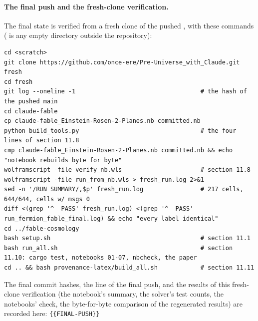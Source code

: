 \paragraph{The final push and the fresh-clone verification.} The final state is verified from a fresh clone of
the pushed , with these commands ( is any empty directory outside the
repository):
\begin{Verbatim}[fontsize=\scriptsize]
cd <scratch>
git clone https://github.com/once-ere/Pre-Universe_with_Claude.git fresh
cd fresh
git log --oneline -1                                   # the hash of the pushed main
cd claude-fable
cp claude-fable_Einstein-Rosen-2-Planes.nb committed.nb
python build_tools.py                                  # the four lines of section 11.8
cmp claude-fable_Einstein-Rosen-2-Planes.nb committed.nb && echo "notebook rebuilds byte for byte"
wolframscript -file verify_nb.wls                      # section 11.8
wolframscript -file run_from_nb.wls > fresh_run.log 2>&1
sed -n '/RUN SUMMARY/,$p' fresh_run.log                # 217 cells, 644/644, cells w/ msgs 0
diff <(grep '^  PASS' fresh_run.log) <(grep '^  PASS' run_fermion_fable_final.log) && echo "every label identical"
cd ../fable-cosmology
bash setup.sh                                          # section 11.1
bash run_all.sh                                        # section 11.10: cargo test, notebooks 01-07, nbcheck, the paper
cd .. && bash provenance-latex/build_all.sh            # section 11.11
\end{Verbatim}
The final commit hashes, the  line of the final push, and the results of this fresh-clone
verification (the notebook's summary, the solver's test counts, the notebooks' check, the byte-for-byte
comparison of the regenerated results) are recorded here: \texttt{\{\{FINAL-PUSH\}\}}


